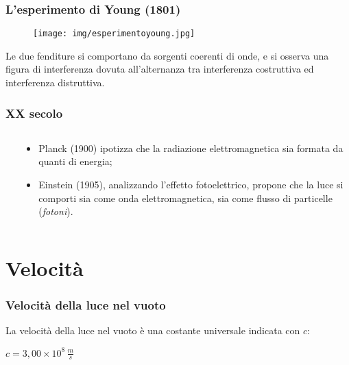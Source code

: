 \documentclass[]{beamer}
\theoremstyle{plain}
\begin{document}
\begin{frame}
\frametitle{L'esperimento di Young (1801)}
\begin{figure}
\texttt{[image: img/esperimentoyoung.jpg]}
\end{figure}

Le due fenditure si comportano da sorgenti coerenti di onde, e si osserva una \alert{figura di interferenza} dovuta all'alternanza tra interferenza costruttiva ed interferenza distruttiva. 

\begin{center}
\href{gif/young.gif}{}
\end{center}
\end{frame}



\begin{frame}
\frametitle{XX secolo}
\begin{columns}
\begin{column}{0.2\textwidth}
~
\end{column}
\begin{column}{0.7\textwidth}
\begin{itemize}
  \item<1-> Planck (1900) ipotizza che la radiazione elettromagnetica sia formata da quanti di energia;
  \item<2-> Einstein (1905), analizzando l'effetto fotoelettrico, propone che la luce si comporti sia come onda elettromagnetica, sia come flusso di particelle (\emph{fotoni}).
\end{itemize}
\end{column}
\end{columns}
\end{frame}


\section{Velocità}

\begin{frame}
\frametitle{Velocità della luce nel vuoto}
La velocità della luce nel vuoto è una costante universale indicata con $ c $:

\begin{center}
\colorbox{blue!30}{$ c = 3,00 \times 10^8 \, \frac{m}{s} $} 
\end{center}
\end{frame}
\end{document}
